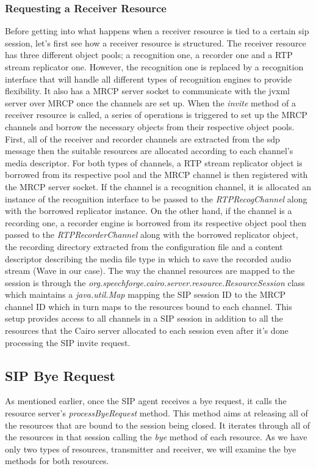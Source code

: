 \subsubsection{Requesting a Receiver Resource}
Before getting into what happens when a receiver resource is tied to a certain \ac{sip} session, let's first see how a receiver resource is structured.
The receiver resource has three different object pools; a recognition one, a recorder one and a RTP stream replicator one.
However, the recognition one is replaced by a recognition interface that will handle all different types of recognition engines to provide flexibility.
It also has a MRCP server socket to communicate with the \ac{jvxml} server over MRCP once the channels are set up.
When the \textit{invite} method of a receiver resource is called, a series of operations is triggered to set up the MRCP channels and borrow the necessary objects from their respective object pools.
First, all of the receiver and recorder channels are extracted from the \ac{sdp} message then the suitable resources are allocated according to each channel's media descriptor.
For both types of channels, a RTP stream replicator object is borrowed from its respective pool and the MRCP channel is then registered with the MRCP server socket.
If the channel is a recognition channel, it is allocated an instance of the recognition interface to be passed to the \textit{RTPRecogChannel} along with the borrowed replicator instance.
On the other hand, if the channel is a recording one, a recorder engine is borrowed from its respective object pool then passed to the \textit{RTPRecorderChannel} along with the borrowed replicator object, the recording directory extracted from the configuration file and a content descriptor describing the media file type in which to save the recorded audio stream (Wave in our case).
The way the channel resources are mapped to the session is through the \textit{org.speechforge.cairo.server.resource.ResourceSession} class which maintains a \textit{java.util.Map} mapping the SIP session ID to the MRCP channel ID which in turn maps to the resources bound to each channel.
This setup provides access to all channels in a SIP session in addition to all the resources that the Cairo server allocated to each session even after it's done processing the SIP invite request.

\subsection{SIP Bye Request}
As mentioned earlier, once the SIP agent receives a bye request, it calls the resource server's \textit{processByeRequest} method.
This method aims at releasing all of the resources that are bound to the session being closed.
It iterates through all of the resources in that session calling the \textit{bye} method of each resource.
As we have only two types of resources, transmitter and receiver, we will examine the bye methods for both resources.

